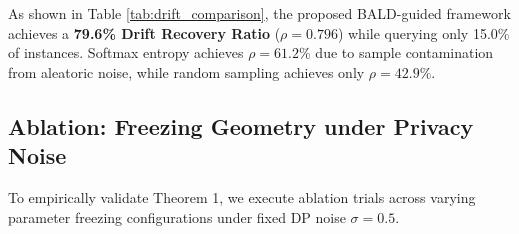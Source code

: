 \documentclass[conference]{IEEEtran}
\begin{document}
\begin{table}[htbp]
\caption{Comparative Drift Adaptation Performance Across Methods}
\label{tab:drift_comparison}
\begin{center}
\end{center}
\end{table}

As shown in Table \ref{tab:drift_comparison}, the proposed BALD-guided framework achieves a \textbf{79.6\% Drift Recovery Ratio} ($\rho = 0.796$) while querying only 15.0\% of instances. Softmax entropy achieves $\rho = 61.2\%$ due to sample contamination from aleatoric noise, while random sampling achieves only $\rho = 42.9\%$.

\subsection{Ablation: Freezing Geometry under Privacy Noise}
To empirically validate Theorem 1, we execute ablation trials across varying parameter freezing configurations under fixed DP noise $\sigma = 0.5$.
\end{document}
